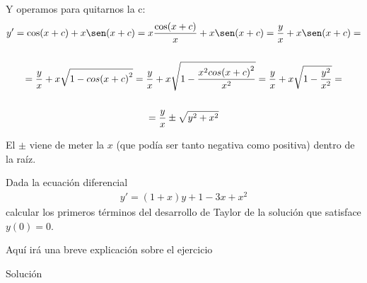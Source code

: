 \documentclass[nochap]{apuntes}
\begin{document}
\begin{problem}[6]
Y operamos para quitarnos la c:
\begin{gather*}
y'=\cos(x+c)+x\sen(x+c)=x\frac{\cos(x+c)}{x}+x\sen(x+c)=\frac{y}{x}+x\sen(x+c)=\\\\
=\frac{y}{x}+x\sqrt{1-{cos(x+c)}^2}=\frac{y}{x}+x\sqrt{1-\frac{x^2{cos(x+c)}^2}{x^2}}=\frac{y}{x}+x\sqrt{1-\frac{y^2}{x^2}}=\\\\
=\frac{y}{x}\pm\sqrt{y^2+x^2}
\end{gather*}
\begin{expla}
El $\pm$ viene de meter la $x$ (que podía ser tanto negativa como positiva) dentro de la raíz.
\end{expla}

\end{problem}
\newpage


\begin{problem}[7]
Dada la ecuación diferencial
\begin{gather*}
y'=(1+x)y+1-3x+x^2
\end{gather*}
calcular los primeros términos del desarrollo de Taylor de la solución que satisface $y(0) = 0$.

\solution

\begin{expla}
Aquí irá una breve explicación sobre el ejercicio
\end{expla}

Solución

\end{problem}
\end{document}
